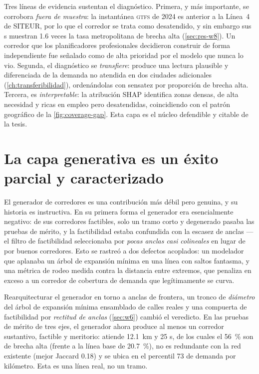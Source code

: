 Tres líneas de evidencia sustentan el diagnóstico. Primera, y más importante, se
corrobora \emph{fuera de muestra}: la instantánea \textsc{gtfs} de 2024 es anterior a
la Línea~4 de SITEUR, por lo que el corredor se trata como desatendido, y sin embargo
sus \ageb{}s muestran \num{1.6} veces la tasa metropolitana de brecha alta
(\cref{sec:res-w8}). Un corredor que los planificadores profesionales decidieron
construir de forma independiente fue señalado como de alta prioridad por el modelo que
nunca lo vio. Segunda, el diagnóstico se \emph{transfiere}: produce una lectura
plausible y diferenciada de la demanda no atendida en dos ciudades adicionales
(\cref{ch:transferibilidad}), ordenándolas con sensatez por proporción de brecha alta.
Tercera, es \emph{interpretable}: la atribución SHAP identifica zonas densas, de alta
necesidad y ricas en empleo pero desatendidas, coincidiendo con el patrón geográfico
de la \cref{fig:coverage-gap}. Esta capa es el núcleo defendible y citable de la tesis.

\section{La capa generativa es un éxito parcial y caracterizado}
\label{sec:disc-generative}

El generador de corredores es una contribución más débil pero genuina, y su historia
es instructiva. En su primera forma el generador era esencialmente negativo: de sus
corredores factibles, solo un tramo corto y degenerado pasaba las pruebas de mérito, y
la factibilidad estaba confundida con la escasez de anclas ---el filtro de
factibilidad seleccionaba por \emph{pocas anclas casi colineales} en lugar de por
buenos corredores. Esto se rastreó a dos defectos acoplados: un modelador que aplanaba
un árbol de expansión mínima en una línea con saltos fantasma, y una métrica de rodeo
medida contra la distancia entre extremos, que penaliza en exceso a un corredor de
cobertura de demanda que legítimamente se curva.

Rearquitecturar el generador en torno a anclas de frontera, un tronco de
\emph{diámetro} del árbol de expansión mínima ensamblado de calles reales y una
compuerta de factibilidad por \emph{rectitud de anclas} (\cref{sec:w6}) cambió el
veredicto. En las pruebas de mérito de tres ejes, el generador ahora produce al menos un corredor
sustantivo, factible y meritorio:  atiende \SI{12.1}{\kilo\metre} y
\num{25} \ageb{}s, de los cuales el \SI{56}{\percent} son de brecha alta (frente a la
línea base de \SI{20.7}{\percent}), no es redundante con la red existente (mejor
Jaccard \num{0.18}) y se ubica en el percentil \num{73} de demanda por kilómetro. Esta
es una línea real, no un tramo.

